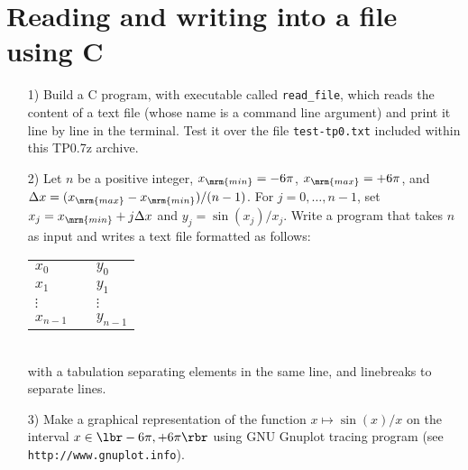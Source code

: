 \documentclass[a4paper,12pt]{article}
\begin{document}
\section{Reading and writing into a file using C}

\begin{itemize}

\item[1)] Build a C program, with executable called \texttt{read\_file},
  which reads the content of a text file (whose name is a command line argument) 
  and print it line by line in the terminal. Test it over the file 
  \texttt{test-tp0.txt} included within this TP0.7z archive.\\
  
\item[2)] Let $n$ be a positive integer, $x_{\mrm{min}} = -6\pi$, $x_{\mrm{max}} = +6\pi$, and $
  \Delta x = (x_{\mrm{max}}-x_{\mrm{min}})/(n-1)$. For $j=0,\dots, n-1$, set  
  $x_j = x_{\mrm{min}} + j \Delta x$ and $y_j = \sin(x_j)/x_j$. Write a program that
  takes $n$ as input and writes a text file formatted as follows:\\[10pt]
  \begin{tabular}{lll}
    $x_0$ & &$y_0$\\
    $x_1$ & &$y_1$\\
    $\vdots$ && $\vdots$\\
    $x_{n-1}$ && $y_{n-1}$\\   
  \end{tabular}
  \quad\\[10pt]
  with a tabulation separating elements in the same line, and linebreaks to separate lines.\\

\item[3)] Make a graphical representation of the function $x\mapsto \sin(x)/x$ on the interval 
  $x\in \lbr-6\pi,+6\pi\rbr$ using GNU Gnuplot tracing program (see \texttt{http://www.gnuplot.info}).

\end{itemize}
\end{document}
